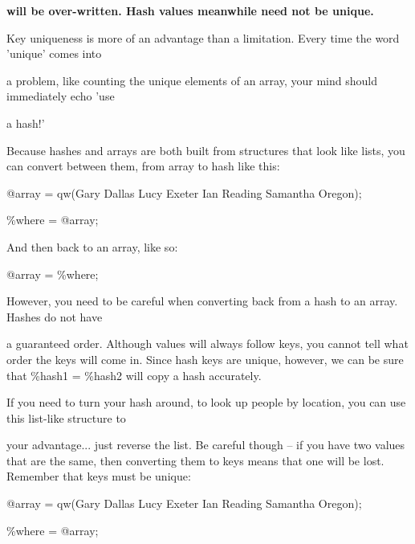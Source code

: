 \documentclass[a4paper,11pt]{book}
\begin{document}
\noindent \textbf{will be over-written. Hash values meanwhile need not be unique.}

\noindent 

\noindent 

\noindent Key uniqueness  is more of an  advantage  than  a  limitation.  Every  time  the  word 'unique'  comes into

\noindent a  problem,  like  counting the  unique  elements  of  an  array,  your mind  should  immediately  echo  'use

\noindent a  hash!'

\noindent 

\noindent Because hashes and arrays are both built from structures that look like lists, you can convert between them, from array to hash like this:

\noindent 

\noindent @array = qw(Gary Dallas Lucy Exeter Ian Reading Samantha Oregon);

\noindent \%where = @array;

\noindent 

\noindent And then back to an array, like so:

\noindent 

\noindent @array = \%where;

\noindent 

\noindent However, you need to be careful when converting back from a hash to an array. Hashes do not have

\noindent a guaranteed order. Although values will always follow keys, you cannot tell what order the keys will come in. Since hash keys are unique, however, we can be sure that \%hash1 = \%hash2 will copy a hash accurately.

\noindent 

\noindent 

\noindent If you need to turn your hash around, to look up people by location, you can use this list-like structure to

\noindent your advantage... just reverse the list. Be careful though -- if you have two values that are the same, then converting them to keys means that one will be lost. Remember that keys must be unique:

\noindent 

\noindent @array = qw(Gary Dallas Lucy Exeter Ian Reading Samantha Oregon);

\noindent \%where = @array;

\noindent 
\end{document}
